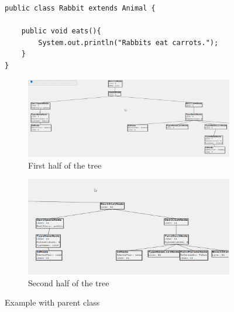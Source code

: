 \documentclass[a4paper]{article}
\begin{document}
\begin{figure}[h!]
\begin{center}
\begin{lstlisting}
public class Rabbit extends Animal {

	public void eats(){
		System.out.println("Rabbits eat carrots.");	
	}
}
\end{lstlisting}

     \centering
     \begin{subfigure}[b]{\textwidth}
         \centering
         \includegraphics[width=\textwidth]{rabbit_ast1}
         \caption{First half of the tree}
     \end{subfigure}
     \quad
     \begin{subfigure}[b]{\textwidth}
         \centering
         \includegraphics[width=\textwidth]{rabbit_ast2}
         \caption{Second half of the tree}
     \end{subfigure}

\caption{Example with parent class}
\label{fig:ast3}
\end{center}
\end{figure}
\end{document}
